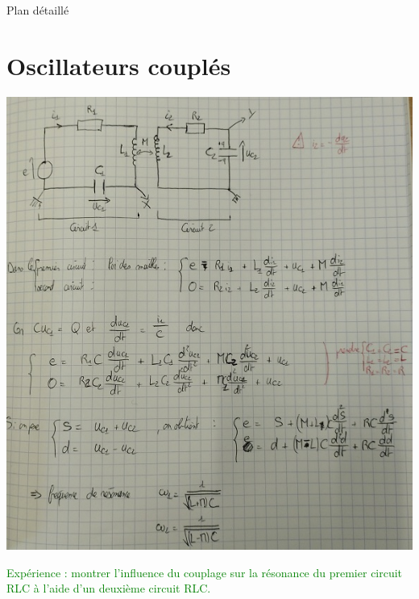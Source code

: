 \begin{reportBlock}{Plan détaillé}
  \section{Oscillateurs couplés}
\begin{center}
    \includegraphics[scale=0.5]{LP_Resonance/Oscillateurs_couple.jpg}
\end{center}    


\textcolor{green}{Expérience : montrer l'influence du couplage sur la résonance du premier circuit RLC à l'aide d'un deuxième circuit RLC.}
  \section{}
\end{reportBlock}